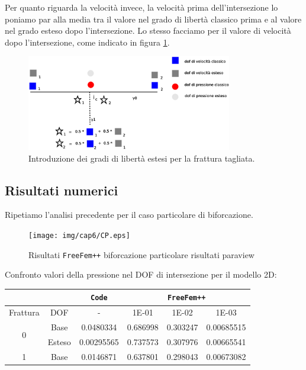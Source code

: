 \noindent Per quanto riguarda la velocità invece, la velocità prima dell'intersezione lo poniamo par alla media tra il valore nel grado di libertà classico prima e al valore nel grado esteso dopo l'intersezione. Lo stesso facciamo per il valore di velocità dopo l'intersezione, come indicato in figura \ref{xfem}. \\

\newpage
\begin{figure}[htbp]
\begin{center}
\includegraphics[width=0.8\textwidth]{img/cap6/xfem.eps}
\caption{Introduzione dei gradi di libertà estesi per la frattura tagliata.}\label{xfem}
\end{center}
\end{figure}

\subsection{Risultati numerici}
Ripetiamo l'analisi precedente per il caso particolare di biforcazione.
\begin{figure}[h!]
\centering
\texttt{[image: img/cap6/CP.eps]}
\caption{Risultati \texttt{FreeFem++} biforcazione particolare risultati paraview }\label{CPParaview}
\end{figure}
Confronto valori della pressione nel DOF di intersezione per il modello 2D:\\
\begin{center}
\begin{tabular}{|c|c|c|c|c|c|}
\hline
  & & \textbf{\texttt{Code}} & \multicolumn{3}{|c|}{\textbf{\texttt{FreeFem++}}} \\
\hline
\multicolumn{1}{|c|}{Frattura} & DOF & - &
\multicolumn{1}{|c|}{1E-01} & 1E-02 & 1E-03 \\
\hline
\multirow{2}{*}{0} & Base & 0.0480334 & 0.686998 & 0.303247 & 0.00685515\\
\cline{2-6}
& Esteso & 0.00295565 & 0.737573 & 0.307976 & 0.00665541\\
\hline
 1 & Base & 0.0146871 & 0.637801 & 0.298043 & 0.00673082\\
\hline
\end{tabular}
\end{center}

